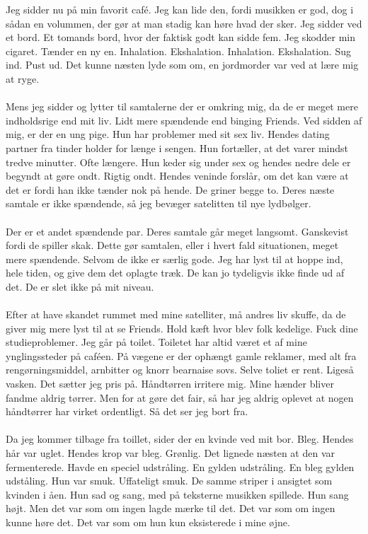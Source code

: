 \documentclass[]{article}
\begin{document}
Jeg sidder nu på min favorit café. Jeg kan lide den, fordi musikken er god, dog i sådan en volummen, der gør at man stadig kan høre hvad der sker. Jeg sidder ved et bord. Et tomands bord, hvor der faktisk godt kan sidde fem. Jeg skodder min cigaret. Tænder en ny en. Inhalation. Ekshalation. Inhalation. Ekshalation. Sug ind. Pust ud. Det kunne næsten lyde som om, en jordmorder var ved at lære mig at ryge.
\\ \\
Mens jeg sidder og lytter til samtalerne der er omkring mig, da de er meget mere indholdsrige end mit liv. Lidt mere spændende end binging Friends. Ved sidden af mig, er der en ung pige. Hun har problemer med sit sex liv. Hendes dating partner fra tinder holder for længe i sengen. Hun fortæller, at det varer mindst tredve minutter. Ofte længere. Hun keder sig under sex og hendes nedre dele er begyndt at gøre ondt. Rigtig ondt. Hendes veninde forslår, om det kan være at det er fordi han ikke tænder nok på hende. De griner begge to. Deres næste samtale er ikke spændende, så jeg bevæger satelitten til nye lydbølger. 
\\ \\
Der er et andet spændende par. Deres samtale går meget langsomt. Ganskevist fordi de spiller skak. Dette gør samtalen, eller i hvert fald situationen, meget mere spændende. Selvom de ikke er særlig gode. Jeg har lyst til at hoppe ind, hele tiden, og give dem det oplagte træk. De kan jo tydeligvis ikke finde ud af det. De er slet ikke på mit niveau.
\\ \\
Efter at have skandet rummet med mine satelliter, må andres liv skuffe, da de giver mig mere lyst til at se Friends. Hold kæft hvor blev folk kedelige. Fuck dine studieproblemer. Jeg går på toilet. Toiletet har altid været et af mine ynglingssteder på caféen. På vægene er der ophængt gamle reklamer, med alt fra rengørningsmiddel, arnbitter og knorr bearnaise sovs. Selve toliet er rent. Ligeså vasken. Det sætter jeg pris på. Håndtørren irritere mig. Mine hænder bliver fandme aldrig tørrer. Men for at gøre det fair, så har jeg aldrig oplevet at nogen håndtørrer har virket ordentligt. Så det ser jeg bort fra.
\\ \\
Da jeg kommer tilbage fra toillet, sider der en kvinde ved mit bor. Bleg. Hendes hår var uglet. Hendes krop var bleg. Grønlig. Det lignede næsten at den var fermenterede. Havde en speciel udstråling. En gylden udstråling. En bleg gylden udståling. Hun var smuk. Uffateligt smuk. De samme striper i ansigtet som kvinden i åen. Hun sad og sang, med på teksterne musikken spillede. Hun sang højt. Men det var som om ingen lagde mærke til det. Det var som om ingen kunne høre det. Det var som om hun kun eksisterede i mine øjne.
\end{document}
